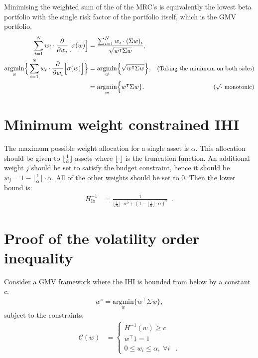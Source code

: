 \documentclass[a4paper,11pt,nocenter,bold,noupper,headcount]{mythesis}
\theoremstyle{plain}
\theoremstyle{definition}
\begin{document}
Minimising the weighted sum of the of the MRC's is equivalently the lowest beta portfolio with the single risk factor of the portfolio itself, which is the GMV portfolio.
\begin{align*}
\sum_{i = 1}^N w_i \cdot \frac{\partial}{\partial w_i} \Big [ \sigma(w) \Big ] & = \frac{\sum_{i = 1}^N w_i \cdot (\Sigma w)_i}{\sqrt{w^\intercal \Sigma w}}, & \\
\underset{w}{\text{argmin}} \Big \{\sum_{i = 1}^N w_i \cdot \frac{\partial}{\partial w_i} \Big [ \sigma(w) \Big ]  \Big \} & = \underset{w}{\text{argmin}} \Big \{ \sqrt{w^\intercal \Sigma w} \Big\},&   \footnotesize\text{(Taking the minimum on   both sides)}\\
& = \underset{w}{\text{argmin}} \Big \{w^\intercal \Sigma w \} . & \footnotesize \text{($\sqrt{\cdot}$ monotonic)}\\
\end{align*}

\section{Minimum weight constrained IHI} \label{IHI_max}

The maximum possible weight allocation for a single asset is $\alpha$. This allocation should be given to $\lfloor \frac{1}{\alpha} \rfloor$ assets where $\lfloor \cdot \rfloor$ is the truncation function. An additional weight $j$ should be set to satisfy the budget constraint, hence it should be $w_j = 1 - \lfloor \frac{1}{\alpha} \rfloor \cdot \alpha$. All of the other weights should be set to 0. Then the lower bound is:
\begin{align*}
H_{\text{lb}}^{-1} & = \frac{1}{\lfloor \frac{1}{\alpha} \rfloor \cdot \alpha^2 + (1- \lfloor \frac{1}{\alpha}\rfloor \cdot \alpha)^2} \;\; .
\end{align*}
 

\section{Proof of the volatility order inequality} \label{vol_ineq}

Consider a GMV framework where the IHI is bounded from below by a constant $c$:
\begin{align*} 
w^\diamond = \underset{w}{\text{argmin}} \Big \{ w^\intercal \Sigma w \Big \},
\end{align*}
subject to the constraints:
\begin{align*}
\mathcal{C}(w) &= 
\begin{cases}
H^{-1}(w) \geq c \\
w^\intercal \underline{1} = 1 \;\; \\
0 \leq w_i \leq \alpha, \; \forall i \;\;\; .
\end{cases}
\end{align*}
\end{document}
